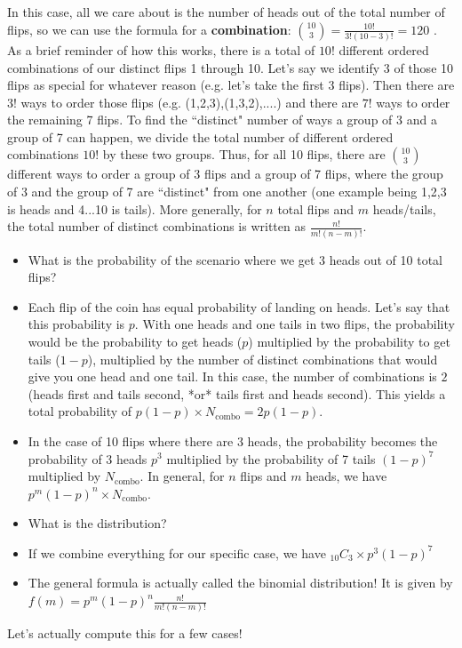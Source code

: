 \documentclass[a4paper,13pt]{report}
\begin{document}
In this case, all we care about is the number of heads out of the total number of flips, so we can use the formula for a \textbf{combination}: $\binom{10}{3}=\frac{10!}{3!(10-3)!}=120$ . As a brief reminder of how this works, there is a total of $10!$ different ordered combinations of our distinct flips 1 through 10. Let's say we identify 3 of those 10 flips as special for whatever reason (e.g. let's take the first 3 flips). Then there are $3!$ ways to order those flips (e.g. (1,2,3),(1,3,2),....) and there are $7!$ ways to order the remaining 7 flips. To find the ``distinct" number of ways a group of 3 and a group of 7 can happen, we divide the total number of different ordered combinations $10!$ by these two groups. Thus, for all 10 flips, there are $\binom{10}{3}$ different ways to order a group of 3 flips and a group of 7 flips, where the group of 3 and the group of 7 are ``distinct" from one another (one example being 1,2,3 is heads and 4...10 is tails). More generally, for $n$ total flips and $m$ heads/tails, the total number of distinct combinations is written as $\frac{n!}{m!(n-m)!}$. \\

\begin{itemize}
 

	\item What is the probability of the scenario where we get 3 heads out of 10 total flips?

	\item Each flip of the coin has equal probability of landing on heads. Let's say that this probability is $p$. With one heads and one tails in two flips, the probability would be the probability to get heads ($p$) multiplied by the probability to get tails ($1-p$), multiplied by the number of distinct combinations that would give you one head and one tail. In this case, the number of combinations is $2$ (heads first and tails second, *or* tails first and heads second). This yields a total probability of $p(1-p)\times N_\mathrm{combo}=2p(1-p)$.

	\item In the case of 10 flips where there are 3 heads, the probability becomes the probability of 3 heads $p^{3}$ multiplied by the probability of 7 tails $(1-p)^{7}$ multiplied by $N_\mathrm{combo}$. In general, for $n$ flips and $m$ heads, we have $p^{m}(1-p)^{n}\times N_\mathrm{combo}$. 



	\item What is the distribution?
	\item If we combine everything for our specific case, we have $_{10}C_{3}\times p^3(1-p)^7$ 
	\item The general formula is actually called the binomial distribution! It is given by $f(m)=p^{m}(1-p)^{n}\frac{n!}{m!(n-m)!}$
\end{itemize}
Let's actually compute this for a few cases!
\end{document}
